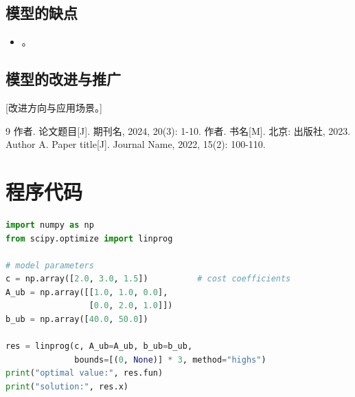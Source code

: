 \documentclass[zihao=-4,a4paper]{ctexart}
\begin{document}
\subsection{模型的缺点}

\begin{itemize}
  \item [缺点 1]。
\end{itemize}

\subsection{模型的改进与推广}

[改进方向与应用场景。]

\begin{thebibliography}{9}
   作者. 论文题目[J]. 期刊名, 2024, 20(3): 1-10.
   作者. 书名[M]. 北京: 出版社, 2023.
   Author A. Paper title[J]. Journal Name, 2022, 15(2): 100-110.
\end{thebibliography}

\appendix

\section{程序代码}

\begin{lstlisting}[language=Python, caption={求解脚本示例 solve.py}]
import numpy as np
from scipy.optimize import linprog

# model parameters
c = np.array([2.0, 3.0, 1.5])          # cost coefficients
A_ub = np.array([[1.0, 1.0, 0.0],
                 [0.0, 2.0, 1.0]])
b_ub = np.array([40.0, 50.0])

res = linprog(c, A_ub=A_ub, b_ub=b_ub,
              bounds=[(0, None)] * 3, method="highs")
print("optimal value:", res.fun)
print("solution:", res.x)
\end{lstlisting}
\end{document}
